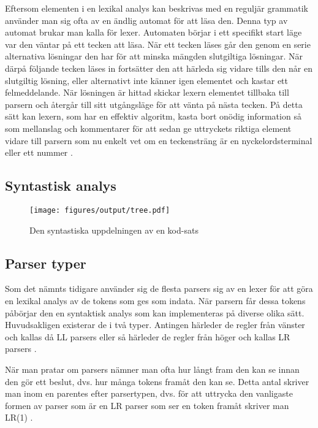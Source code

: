 Eftersom elementen i en lexikal analys kan beskrivas med en reguljär grammatik
använder man sig ofta av en ändlig automat för att läsa den. Denna typ av
automat brukar man kalla för lexer. Automaten börjar i ett specifikt start
läge var den väntar på ett tecken att läsa. När ett tecken läses går den genom
en serie alternativa lösningar den har för att minska mängden slutgiltiga
lösningar. När därpå följande tecken läses in fortsätter den att härleda sig
vidare tills den når en slutgiltig lösning, eller alternativt inte känner igen
elementet och kastar ett felmeddelande. När lösningen är hittad skickar lexern
elementet tillbaka till parsern och återgår till sitt utgångsläge för att
vänta på nästa tecken. På detta sätt kan lexern, som har en effektiv
algoritm, kasta bort onödig information så som mellanslag och kommentarer för
att sedan ge uttryckets riktiga element vidare till parsern som nu enkelt vet
om en teckensträng är en nyckelordsterminal eller ett nummer \citep[s.
51]{sm09}.

\subsection{Syntastisk analys}

\begin{figure}[ht]
  \texttt{[image: figures/output/tree.pdf]}
  \caption{Den syntastiska uppdelningen av en kod-sats}
\end{figure}

\subsection{Parser typer}

Som det nämnts tidigare använder sig de flesta parsers sig av en lexer för att
göra en lexikal analys av de tokens som ges som indata. När parsern får dessa
tokens påbörjar den en syntaktisk analys som kan implementeras på diverse
olika sätt. Huvudsakligen existerar de i två typer. Antingen härleder de
regler från vänster och kallas då LL parsers eller så härleder de regler från
höger och kallas LR parsers \citep[s. 67]{sm09}.

När man pratar om parsers nämner man ofta hur långt fram den kan se innan den
gör ett beslut, dvs. hur många tokens framåt den kan se. Detta antal skriver
man inom en parentes efter parsertypen, dvs. för att uttrycka den vanligaste
formen av parser som är en LR parser som ser en token framåt skriver man
LR(1) \citep[s. 69]{sm09}.

